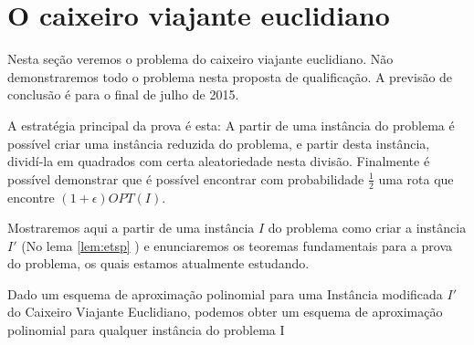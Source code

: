 \section{O caixeiro viajante euclidiano}

Nesta seção veremos o problema do caixeiro viajante euclidiano. Não demonstraremos todo o problema nesta proposta de qualificação. A previsão de conclusão é para o final de julho de 2015.

A estratégia principal da prova é esta: A partir de uma instância do problema é possível criar uma instância reduzida do problema, e partir desta instância, dividí-la em quadrados com certa aleatoriedade nesta divisão. Finalmente é possível demonstrar \cite{Williamson} que é possível encontrar com probabilidade $\frac{1}{2}$ uma rota que encontre $(1 + \epsilon) OPT(I)$.

Mostraremos aqui a partir de uma instância $I$ do problema como criar a instância $I'$ (No lema \ref{lem:etsp} ) e enunciaremos os teoremas fundamentais para a prova do problema, os quais estamos atualmente estudando.

\begin{lema}
\label{lem:etsp}
Dado um esquema de aproximação polinomial para uma Instância modificada $I'$ do Caixeiro Viajante Euclidiano, podemos obter um esquema de aproximação polinomial para qualquer instância do problema I
\end{lema}

